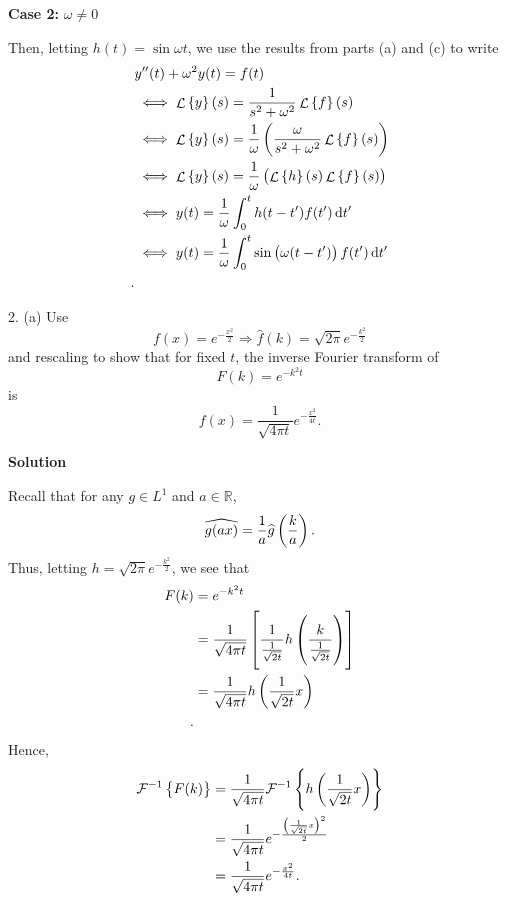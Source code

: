 \documentclass{article}
\DeclareMathOperator{\Lagr}{\mathcal{L}}
\begin{document}
\textbf{Case 2:} $\omega \neq 0$

Then, letting $h(t) = \sin \omega t$, we use the results from parts (a)
and (c) to write
%
\begin{align*}
    &y^{\prime \prime}(t) + \omega^2 y(t) = f(t) \\
    &\iff \Lagr \cbr{y}(s) = \frac{1}{s^2 + \omega^2} \Lagr \cbr{f}(s) \\
    &\iff \Lagr \cbr{y}(s) = \frac{1}{\omega} \del{\frac{\omega}{s^2 + \omega^2} \Lagr \cbr{f}(s)} \\
    &\iff \Lagr \cbr{y}(s) = \frac{1}{\omega} \del{\Lagr \cbr{h}(s) \Lagr \cbr{f}(s)} \\
    &\iff y(t) = \frac{1}{\omega} \int_0^t h(t - t^\prime) f(t^\prime) \dif t^\prime \\
    &\iff y(t) = \frac{1}{\omega} \int_0^t \sin \del{\omega (t - t^\prime)} f(t^\prime) \dif t^\prime \\
    .
\end{align*}

\newpage

2. (a) Use
%
\begin{equation*}
    f(x) = e^{- \frac{x^2}{2}} \Rightarrow \widehat{f}(k) = \sqrt{2 \pi} e^{- \frac{k^2}{2}}
\end{equation*}
%
and rescaling to show that for fixed $t$, the inverse Fourier transform of
%
\begin{equation*}
    F(k) = e^{- k^2 t}
\end{equation*}
%
is
%
\begin{equation*}
    f(x) = \frac{1}{\sqrt{4 \pi t}} e^{- \frac{x^2}{4 t}}
    .
\end{equation*}

\textbf{Solution}

Recall that for any $g \in L^1$ and $a \in \mathbb{R}$,
%
\begin{equation*}
    \widehat{g(a x)} = \frac{1}{a} \widehat{g} \del{\frac{k}{a}}
    .
\end{equation*}
%
Thus, letting $h = \sqrt{2 \pi} e^{- \frac{k^2}{2}}$, we see that
%
\begin{align*}
    F(k)
        &= e^{- k^2 t} \\
        &= \frac{1}{\sqrt{4 \pi t}} \sbr{\frac{1}{\frac{1}{\sqrt{2 t}}} h \del{\frac{k}{\frac{1}{\sqrt{2 t}}}}} \\
        &= \frac{1}{\sqrt{4 \pi t}} h \del{\frac{1}{\sqrt{2 t}} x} \\
        .
\end{align*}
%
Hence,
%
\begin{align*}
    \mathcal{F}^{-1} \cbr{F(k)}
        &= \frac{1}{\sqrt{4 \pi t}} \mathcal{F}^{-1} \cbr{h \del{\frac{1}{\sqrt{2 t}} x}} \\
        &= \frac{1}{\sqrt{4 \pi t}} e^{- \frac{\del{\frac{1}{\sqrt{2 t}} x}^2}{2}} \\
        &= \frac{1}{\sqrt{4 \pi t}} e^{- \frac{x^2}{4 t}}
        .
\end{align*}
\end{document}
